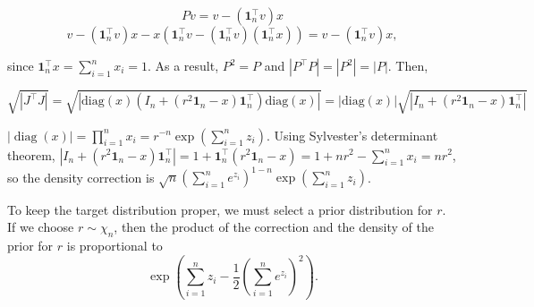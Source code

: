 \documentclass[twoside]{article}
\begin{document}
$$Pv = v - (\boldsymbol{1}^\top_n v) x$$
$$v - (\boldsymbol{1}^\top_n v) x - x (\boldsymbol{1}^\top_nv - (\boldsymbol{1}^\top_n v) (\boldsymbol{1}^\top_n x)) = v - (\boldsymbol{1}^\top_n v) x,$$

since $\boldsymbol{1}^\top_n x = \sum_{i=1}^n x_i = 1$.
As a result, $P^2 = P$ and $|P^\top P| = |P^2| = |P|$.
Then,

$$\sqrt{|J^\top J|} = \sqrt{|\mathrm{diag}(x)(I_n + (r^2 \boldsymbol{1}_n - x) \boldsymbol{1}_n^\top)\mathrm{diag}(x)|} = |\mathrm{diag}(x)|\sqrt{|I_n + (r^2 \boldsymbol{1}_n - x) \boldsymbol{1}_n^\top|}$$


$|\operatorname{diag}(x)| = \prod_{i=1}^n x_i = r^{-n} \exp (\sum_{i=1}^n z_i)$. 
Using Sylvester's determinant theorem, $|I_n + (r^2 \boldsymbol{1}_n - x) \boldsymbol{1}_n^\top| = 1 + \boldsymbol{1}_n^\top (r^2 \boldsymbol{1}_n - x) = 1 + n r^2 - \sum_{i=1}^n x_i = n r^2$, so the density correction is $\sqrt{n} (\sum_{i=1}^n e^{z_i})^{1-n} \exp(\sum_{i=1}^n z_i)$.

To keep the target distribution proper, we must select a prior distribution for $r$.
If we choose $r \sim \chi_n$, then the product of the correction and the density of the prior for $r$ is proportional to
$$\exp\left(\sum_{i=1}^n z_i - \frac{1}{2}(\sum_{i=1}^n e^{z_i})^2\right).$$

\vfill
\end{document}
